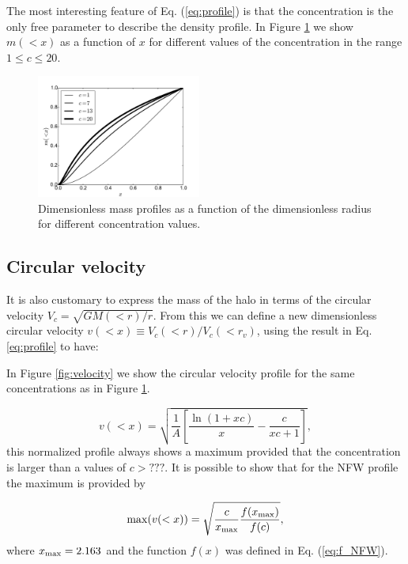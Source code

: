 \documentclass[useAMS,usenatbib]{mn2e}
\begin{document}
The most interesting feature of Eq. (\ref{eq:profile}) is that the
concentration is the only free parameter to describe the density
profile. In Figure \ref{fig:profiles} we show $m(<x)$ as
a function of $x$ for different values of the concentration in the range
$1\leq c \leq 20$.

\begin{figure}
\begin{center}
  \includegraphics[width=0.48\textwidth]{nfw_normalized.pdf}
\end{center}
\caption{Dimensionless mass profiles as a function of the
  dimensionless radius for different concentration values.
    \label{fig:profiles}}
\end{figure}

\subsection{Circular velocity}

It is also customary to express the mass of the halo in terms of the
circular velocity $V_{c}=\sqrt{GM(<r)/r}$. From this we can
define a new dimensionless circular velocity $v(<x)\equiv
V_{c}(<r)/V_{c}(<r_v)$, using the result in Eq. \ref{eq:profile}
to have:


In Figure \ref{fig:velocity} we show the circular velocity profile for the same
concentrations as in Figure \ref{fig:profiles}.

\begin{equation}
v(<x)=\sqrt{\frac{1}{A}\left[\frac{\ln\left(1+xc\right)}{x}-\frac{c}{xc+1}\right]},
\end{equation}
%
this normalized profile always shows a maximum provided that the
concentration is larger than a values of $c>???$.
It is possible to show that for the NFW profile the maximum is
provided by

\begin{equation}
\mathrm{max}(v(<x)) = \sqrt{\frac{c}{x_{\rm max}}\frac{f(x_{\rm
      max})}{f(c)}},
\label{eq:max_v}
\end{equation}
where $x_{\rm max}=2.163$ and the function $f(x)$ was defined in Eq. (\ref{eq:f_NFW}).
\end{document}
